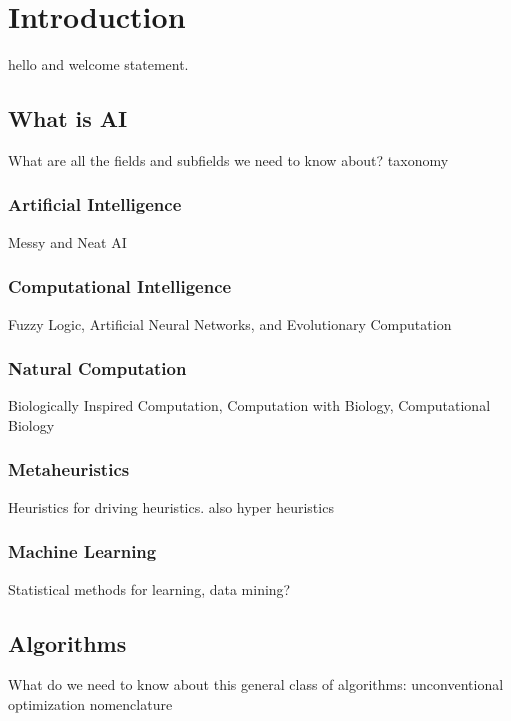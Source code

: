 


\chapter{Introduction}
\label{chap:intro}

hello and welcome statement.

% 
% 
\section{What is AI}
\label{intro:sec:what_is_ai}
What are all the fields and subfields we need to know about? 
taxonomy

\subsection{Artificial Intelligence}
Messy and Neat AI

\subsection{Computational Intelligence}
Fuzzy Logic, Artificial Neural Networks, and Evolutionary Computation

\subsection{Natural Computation}
Biologically Inspired Computation, Computation with Biology, Computational Biology

\subsection{Metaheuristics}
Heuristics for driving heuristics. also hyper heuristics

\subsection{Machine Learning}
Statistical methods for learning, data mining?

% 
% 
\section{Algorithms}
\label{intro:sec:algorithms}
What do we need to know about this general class of algorithms: unconventional optimization
nomenclature

